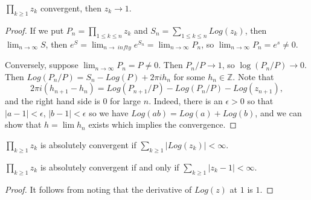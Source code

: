 \documentclass[12pt]{scrartcl}
\newcommand{\Z}{\mathbb{Z}}
\begin{document}
\begin{fact} $\prod_{k \ge 1} z_k$ convergent, then $z_k \to 1$.  
\end{fact}

\begin{proof}
If we put $P_n = \prod_{1 \le k \le n} z_k$ and $S_n = \sum_{1 \le k \le n} Log(z_k)$, then $\lim_{n \to \infty} S$, then $e^S = \lim_{n \to\ infty} e^{S_n} = \lim_{n \to \infty} P_n$, so $\lim_{n \to \infty} P_n = e^s \ne 0$.

Conversely, suppose $\lim_{n \to \infty} P_n = P \ne 0$.  Then $P_n/P \to 1$, so $\log(P_n/P) \to 0$.  Then $Log(P_n/P) = S_n - Log(P) + 2\pi i h_n$ for some $h_n \in \Z$.  Note that 
$$2\pi i(h_{n+1} - h_n) = Log(P_{n+1}/P) - Log(P_n/P) - Log(z_{n+1}),$$
and the right hand side is $0$ for large $n$.  Indeed, there is an $\epsilon > 0$ so that $|a - 1| < \epsilon$, $|b - 1| < \epsilon$ so we have $Log(ab) = Log(a) + Log(b)$, and we can show that $h = \lim h_n$ exists which implies the convergence.  
\end{proof}
\begin{definition} $\prod_{k \ge 1} z_k$ is absolutely convergent if $\sum_{k \ge 1} |Log(z_k)| < \infty$.
\end{definition}
\begin{fact} $\prod_{k \ge 1} z_k$ is absolutely convergent if and only if $\sum_{k \ge 1} |z_k - 1| < \infty$.  
\end{fact}
\begin{proof}
It follows from noting that the derivative of $Log(z)$ at $1$ is $1$.  
\end{proof}
\end{document}
